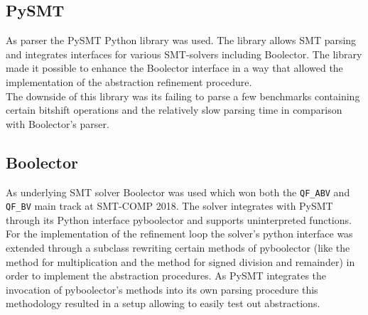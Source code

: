 \subsection{PySMT}
\label{sec:implementation:pysmt}
As parser the PySMT Python library \cite{pysmt2015} was used. The library allows
SMT parsing and integrates interfaces for various SMT-solvers including Boolector.
The library made it possible to enhance the Boolector interface in a way that allowed the implementation
of the abstraction refinement procedure.\\
The downside of this library was its failing to parse a few benchmarks containing certain bitshift operations
and the relatively slow parsing time in comparison with Boolector's parser\footnotemark.

\subsection{Boolector}
\label{sec:implementation:boolector}
As underlying SMT solver Boolector \cite{Brummayer-Biere2009_Chapter_BoolectorAnEfficientSMTSolverF} was used
which won both the \texttt{QF\_ABV} and \texttt{QF\_BV} main track at SMT-COMP 2018\cite{SMTCOMP18-results}.
The solver integrates with PySMT through its Python interface pyboolector and supports uninterpreted functions.
For the implementation of the refinement loop the solver's python interface was extended through a subclass rewriting certain methods of pyboolector
(like the method for multiplication and the method for signed division and remainder) in order to implement the abstraction procedures.
As PySMT integrates the invocation of pyboolector's methods into its own parsing procedure this methodology resulted in a setup allowing to
easily test out abstractions.

